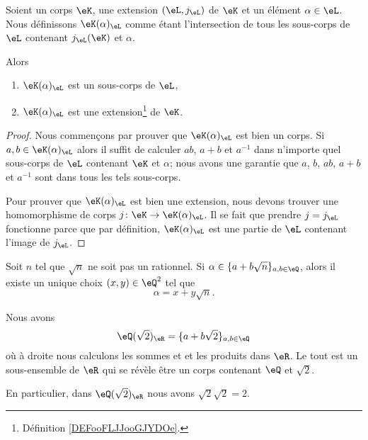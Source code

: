 \begin{propositionDef}  \label{DEFooVSKGooMyeGel}
    Soient un corps \( \eK\), une extension \( (\eL,j_{\eL})\) de \( \eK\) et un élément \( \alpha\in\eL\). Nous définissons \( \eK(\alpha)_{\eL} \) comme étant l'intersection de tous les sous-corps de \( \eL\) contenant \( j_{\eL}(\eK)\) et \( \alpha\).

    Alors
    \begin{enumerate}
        \item
            \( \eK(\alpha)_{\eL}\) est un sous-corps de \( \eL\),
        \item
            \( \eK(\alpha)_{\eL}\) est une extension\footnote{Définition \ref{DEFooFLJJooGJYDOe}.} de \( \eK\).
    \end{enumerate}
\end{propositionDef}

\begin{proof}
    Nous commençons par prouver que \( \eK(\alpha)_{\eL}\) est bien un corps. Si \( a,b\in \eK(\alpha)_{\eL}\) alors il suffit de calculer \( ab\), \( a+b\) et \( a^{-1}\) dans n'importe quel sous-corps de \( \eL\) contenant \( \eK\) et \( \alpha\); nous avons une garantie que \( a\), \( b\), \( ab  \), \( a+b\) et \( a^{-1}\) sont dans tous les tels sous-corps.

    Pour prouver que \( \eK(\alpha)_\eL\) est bien une extension, nous devons trouver une homomorphisme de corps \( j\colon \eK\to \eK(\alpha)_{\eL}\). Il se fait que prendre \( j=j_{\eL}\) fonctionne parce que par définition, \( \eK(\alpha)_{\eL}\) est une partie de \( \eL\) contenant l'image de \( j_{\eL}\).
\end{proof}

\begin{lemma}       \label{LEMooHZLCooPLHkLS}
    Soit \( n\) tel que \( \sqrt{ n }\) ne soit pas un rationnel. Si \( \alpha\in \{ a+b\sqrt{ n } \}_{a,b\in \eQ}\), alors il existe un unique choix \( (x,y)\in \eQ^2\) tel que
    \begin{equation}
        \alpha=x+y\sqrt{ n }.
    \end{equation}
\end{lemma}

\begin{example}
    Nous avons 
    \begin{equation}
        \eQ(\sqrt{ 2 })_{\eR}=\{ a+b\sqrt{ 2 } \}_{a,b\in \eQ}
    \end{equation}
    où à droite nous calculons les sommes et et les produits dans \( \eR\). Le tout est un sous-ensemble de \( \eR\) qui se révèle être un corps contenant \( \eQ\) et \( \sqrt{ 2 }\).

    En particulier, dans \( \eQ(\sqrt{ 2 })_{\eR}\) nous avons \( \sqrt{ 2 }\sqrt{ 2 }=2\).
\end{example}

